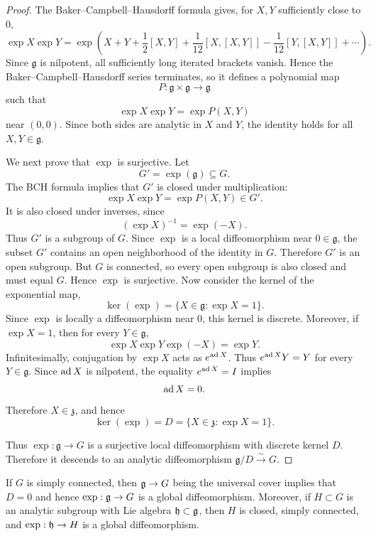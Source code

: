 \documentclass[12pt]{article}
\begin{document}
\begin{proof}
    The Baker--Campbell--Hausdorff formula gives, for \(X,Y\) sufficiently close
    to \(0\),
    \[
        \exp X\exp Y=\exp\left(
        X+Y+\frac12[X,Y]
        +\frac1{12}[X,[X,Y]]
        -\frac1{12}[Y,[X,Y]]
        +\cdots
        \right).
    \]
    Since \(\mathfrak g\) is nilpotent, all sufficiently long iterated brackets
    vanish. Hence the Baker--Campbell--Hausdorff series terminates, so it defines
    a polynomial map
    \[
        P:\mathfrak g\times \mathfrak g\to \mathfrak g
    \]
    such that
    \[
        \exp X\exp Y=\exp P(X,Y)
    \]
    near \((0,0)\). Since both sides are analytic in \(X\) and \(Y\), the identity
    holds for all \(X,Y\in \mathfrak g\).

    We next prove that \(\exp\) is surjective. Let
    \[
        G'=\exp(\mathfrak g)\subseteq G.
    \]
    The BCH formula implies that \(G'\) is closed under multiplication:
    \[
        \exp X\exp Y=\exp P(X,Y)\in G'.
    \]
    It is also closed under inverses, since
    \[
        (\exp X)^{-1}=\exp(-X).
    \]
    Thus \(G'\) is a subgroup of \(G\). Since \(\exp\) is a local diffeomorphism
    near \(0\in \mathfrak g\), the subset \(G'\) contains an open neighborhood of
    the identity in \(G\). Therefore \(G'\) is an open subgroup. But \(G\) is
    connected, so every open subgroup is also closed and must equal \(G\). Hence $\exp$ is surjective.
    Now consider the kernel of the exponential map,
    \[
        \ker(\exp)=\{X\in \mathfrak g:\exp X=1\}.
    \]
    Since \(\exp\) is locally a diffeomorphism near \(0\), this kernel is discrete.
    Moreover, if \(\exp X=1\), then for every \(Y\in\mathfrak g\),
    \[
        \exp X\exp Y\exp(-X)=\exp Y.
    \]
    Infinitesimally, conjugation by \(\exp X\) acts as $e^{\operatorname{ad} X}$. Thus \(e^{\operatorname{ad} X}Y=Y\) for every \(Y\in\mathfrak g\). Since \(\operatorname{ad} X\) is
    nilpotent, the equality \(e^{\operatorname{ad} X}=I\) implies
    \[
        \operatorname{ad} X=0.
    \]
    Therefore \(X\in \mathfrak z\), and hence
    \[
        \ker(\exp)=D=\{X\in \mathfrak z:\exp X=1\}.
    \]

    Thus \(\exp:\mathfrak g\to G\) is a surjective local diffeomorphism with
    discrete kernel \(D\). Therefore it descends to an analytic diffeomorphism $\mathfrak g/D \xrightarrow{\sim} G$.
\end{proof}
If $G$ is simply connected, then $\mathfrak{g} \to G$ being the universal cover implies that $D = 0$ and hence $\exp : \mathfrak{g} \to G$ is a global diffeomorphism. Moreover, if $H \subset G$ is an analytic subgroup with Lie algebra $\mathfrak{h} \subset \mathfrak{g}$, then $H$ is closed, simply connected, and $\exp : \mathfrak{h} \to H$ is a global diffeomorphism.
\end{document}
